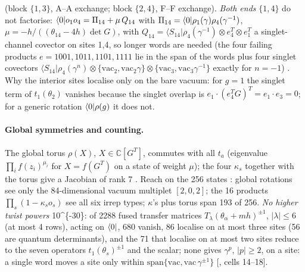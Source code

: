 (block $\{1,3\}$, A--A exchange; block $\{2,4\}$, F--F exchange). \emph{Both ends} $\{1,4\}$ do not factorise: $\langle0|o_1o_4=\Pi_{14}+\mu\,Q_{14}$ with $\Pi_{14}=\langle0|\rho_1(\gamma)\rho_4(\gamma^{-1})$,
$\mu=-h/((\theta_{14}-4h)\det G)$, with $Q_{14}=\langle S_{14}|\rho_4(\gamma^{-1})\otimes e_4^T\otimes e_1^T$ a singlet-channel covector
on sites 1,4, so longer words are needed (the four failing products $e=1001,1011,1101,1111$ lie in the span of the words plus four
singlet covectors $\langle S_{14}|\rho_4(\gamma^{n})\otimes\{\mathrm{vac}_2,\mathrm{vac}_2\gamma\}\otimes\{\mathrm{vac}_3,\mathrm{vac}_3\gamma^{-1}\}$
exactly for $n=-1$) \ex. Why the interior sites localise only on the bare vacuum: for $g=1$ the singlet term of $t_1(\theta_2)$
vanishes because the singlet overlap is $e_1\cdot(e_4^TG)^T=e_1\cdot e_3=0$; for a generic rotation $\langle0|\rho(g)$ it does not.

\paragraph{Global symmetries and counting.} The global torus $\rho(X)$, $X\in\mathbb C[G^T]$, commutes with all $t_a$ (eigenvalue
$\prod_if(z_i)^{\mu_i}$ for $X=f(G^T)$ on a state of weight $\mu$); the four $\kappa_s$ together with the torus give a Jacobian of rank 7
\ex. Reach on the 256 states \ex: global rotations see only the 84-dimensional vacuum multiplet $[2,0,2]$; the 16 products $\prod_s(1-\kappa_s o_s)$ see all six irrep types;
$\kappa$'s plus torus span 193 of 256. \emph{No higher twist powers} \num{10^{-30}}: of 2288 fused transfer matrices $T_\lambda(\theta_\alpha+mh)^{\pm1}$,
$|\lambda|\le6$ (at most 4 rows), acting on $\langle0|$, 680 vanish, 86 localise on at most three sites (56 are quantum determinants), and the
71 that localise on at most two sites reduce to the seven operators $t_1(\theta_s)^{\pm1}$ and the scalar; none gives $\gamma^p$, $|p|\ge2$,
on a site: a single word moves a site only within $\mathrm{span}\{\mathrm{vac},\mathrm{vac}\,\gamma^{\pm1}\}$ [, cells 14--18].

